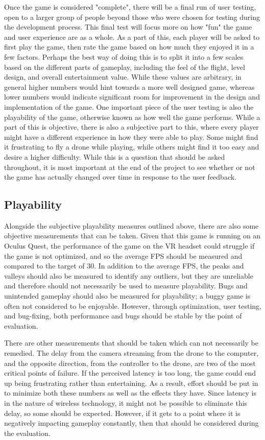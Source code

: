 \documentclass[10pt,twocolumn]{article}
\begin{document}
Once the game is considered "complete", there will be a final run of user testing, open to a larger group of people beyond those who were chosen for testing during the development process. This final test will focus more on how "fun" the game and user experience are as a whole. As a part of this, each player will be asked to first play the game, then rate the game based on how much they enjoyed it in a few factors. Perhaps the best way of doing this is to split it into a few scales based on the different parts of gameplay, including the feel of the flight, level design, and overall entertainment value. While these values are arbitrary, in general higher numbers would hint towards a more well designed game, whereas lower numbers would indicate significant room for improvement in the design and implementation of the game. One important piece of the user testing is also the playability of the game, otherwise known as how well the game performs. While a part of this is objective, there is also a subjective part to this, where every player might have a different experience in how they were able to play. Some might find it frustrating to fly a drone while playing, while others might find it too easy and desire a higher difficulty. While this is a question that should be asked throughout, it is most important at the end of the project to see whether or not the game has actually changed over time in response to the user feedback.

\subsection{Playability}
Alongside the subjective playability measures outlined above, there are also some objective measurements that can be taken. Given that this game is running on an Oculus Quest, the performance of the game on the VR headset could struggle if the game is not optimized, and so the average FPS should be measured and compared to the target of 30. In addition to the average FPS, the peaks and valleys should also be measured to identify any outliers, but they are unreliable and therefore should not necessarily be used to measure playability. Bugs and unintended gameplay should also be measured for playability; a buggy game is often not considered to be enjoyable. However, through optimization, user testing, and bug-fixing, both performance and bugs should be stable by the point of evaluation.

There are other measurements that should be taken which can not necessarily be remedied. The delay from the camera streaming from the drone to the computer, and the opposite direction, from the controller to the drone, are two of the most critical points of failure. If the perceived latency is too long, the game could end up being frustrating rather than entertaining. As a result, effort should be put in to minimize both these numbers as well as the effects they have. Since latency is in the nature of wireless technology, it might not be possible to eliminate this delay, so some should be expected. However, if it gets to a point where it is negatively impacting gameplay constantly, then that should be considered during the evaluation.
\end{document}
